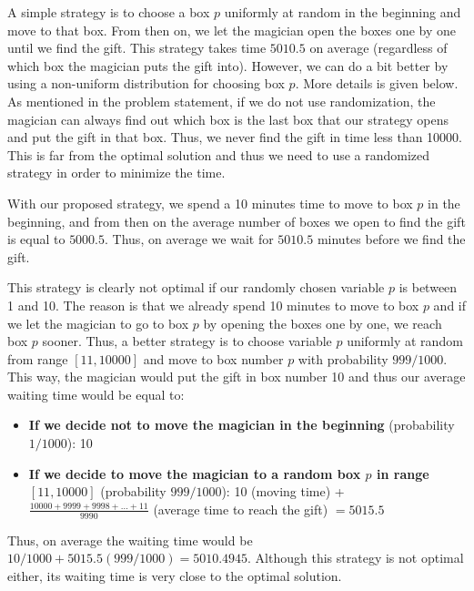 \begin{solution}
A simple  strategy is to choose a box $p$ uniformly at random in the beginning and move to that box. From then on, we let the magician open the boxes one by one until we find the gift. This strategy takes time $5010.5$ on average (regardless of which box the magician puts the gift into). However, we can do a bit better by using a non-uniform distribution for choosing box $p$. More details is given below.\\[0.2cm]

As mentioned in the problem statement, if we do not use randomization, the magician can always find out which box is the last box that our strategy opens and put the gift in that box. Thus, we never find the gift in time less than 10000. This is far from the optimal solution and thus we need to use a randomized strategy in order to minimize the time.

With our proposed strategy, we spend a 10 minutes time to move to box $p$ in the beginning, and from then on the average number of boxes we open to find the gift is equal to $5000.5$. Thus, on average we wait for $5010.5$ minutes before we find the gift.

This strategy is clearly not optimal  if our randomly chosen variable $p$ is between 1 and 10. The reason is that we already spend 10 minutes to move to box $p$ and if we let the magician to go to box $p$ by opening the boxes one by one, we reach box $p$ sooner. Thus, a better strategy is to choose variable $p$ uniformly at random from range $[11, 10000]$ and move to box number $p$ with probability $999/1000$. This way, the magician would put the gift in box number 10 and thus our average waiting time would be equal to:
\begin{itemize}
	\item \textbf{If we decide not to move the magician in the beginning} (probability $1/1000$): 10  
	\item \textbf{If we decide to move the magician to a random box $p$ in range $[11, 10000]$} (probability $999/1000$): 10 (moving time) + $\frac{10000 + 9999 + 9998 + \ldots + 11}{9990}$ (average time to reach the gift) $ = 5015.5$ 
\end{itemize} 
Thus, on average the waiting time would be $10 / 1000 + 5015.5 (999/1000) = 5010.4945$. Although this strategy is not optimal either, its waiting time is very close to the optimal solution.
\end{solution}